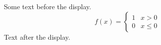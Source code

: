 \documentclass[12pt]{article}
\begin{document}
Some text before the display.
\[ f(x) = \begin{cases} 1 & x > 0 \\ 0 & x \le 0 \end{cases} \]
Text after the display.
\end{document}
